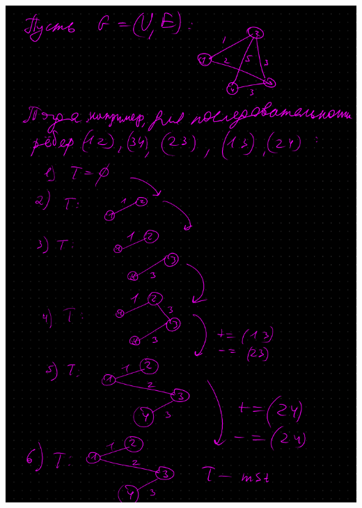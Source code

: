 \documentclass{report}
\begin{document}
\includegraphics[scale=0.7]{a1_alg3_annotated.png}

\pagebreak
\end{document}
